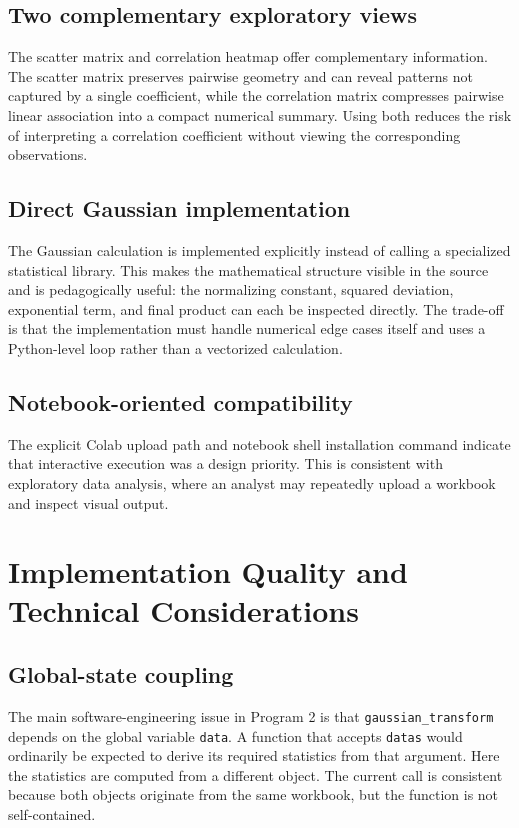 \documentclass[11pt,a4paper]{article}
\begin{document}
\subsection{Two complementary exploratory views}
The scatter matrix and correlation heatmap offer complementary information. The scatter matrix preserves pairwise geometry and can reveal patterns not captured by a single coefficient, while the correlation matrix compresses pairwise linear association into a compact numerical summary. Using both reduces the risk of interpreting a correlation coefficient without viewing the corresponding observations.

\subsection{Direct Gaussian implementation}
The Gaussian calculation is implemented explicitly instead of calling a specialized statistical library. This makes the mathematical structure visible in the source and is pedagogically useful: the normalizing constant, squared deviation, exponential term, and final product can each be inspected directly. The trade-off is that the implementation must handle numerical edge cases itself and uses a Python-level loop rather than a vectorized calculation.

\subsection{Notebook-oriented compatibility}
The explicit Colab upload path and notebook shell installation command indicate that interactive execution was a design priority. This is consistent with exploratory data analysis, where an analyst may repeatedly upload a workbook and inspect visual output.

\section{Implementation Quality and Technical Considerations}
\subsection{Global-state coupling}
The main software-engineering issue in Program 2 is that \texttt{gaussian\_transform} depends on the global variable \texttt{data}. A function that accepts \texttt{datas} would ordinarily be expected to derive its required statistics from that argument. Here the statistics are computed from a different object. The current call is consistent because both objects originate from the same workbook, but the function is not self-contained.
\end{document}
